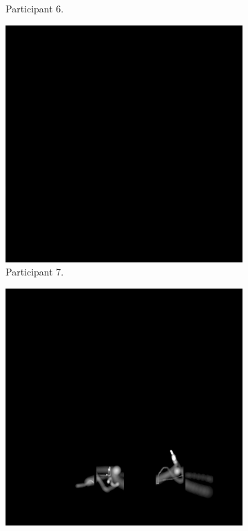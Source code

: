 \begin{figure}[!ht]
\begin{subfigure}[b]{0.24\textwidth}
        \caption{Participant 6.}
    \end{subfigure}
    \hfill    
    \begin{subfigure}[b]{0.24\textwidth}
        \centering
        \includegraphics[width=\textwidth]{img/data/Panel2/single/7.png}
        \caption{Participant 7.}
    \end{subfigure}
    \hfill    
    \begin{subfigure}[b]{0.24\textwidth}
        \centering
        \includegraphics[width=\textwidth]{img/data/Panel2/single/8.png}

\end{subfigure}
\end{figure}
